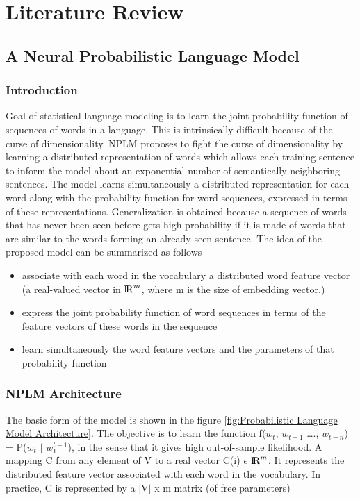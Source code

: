 \chapter{Literature Review}

\section{A Neural Probabilistic Language Model}
\subsection{Introduction}
Goal of statistical language modeling is to learn the joint probability function of sequences of words in a language. This is intrinsically difficult because of the curse of dimensionality. NPLM proposes to fight the curse of dimensionality by learning a distributed representation of words which allows each training sentence to inform the model about an exponential number of semantically neighboring sentences. The model learns simultaneously a distributed representation for each word along with the probability function for word sequences, expressed in terms of these representations. Generalization is obtained because a sequence of words that has never been seen before gets high probability if it is made of words that are similar to the words forming an already seen sentence. The idea of the proposed model can be summarized as follows

\begin{itemize}
    \item associate with each word in the vocabulary a distributed word feature vector (a real-valued vector in ${\rm I\!R}^m$, where m is the size of embedding vector.)
    \item express the joint probability function of word sequences in terms of the feature vectors of these words in the sequence 
    \item learn simultaneously the word feature vectors and the parameters of that probability function
\end{itemize}

\subsection{NPLM Architecture}
The basic form of the model is shown in the figure \ref{fig:Probabilistic Language Model Architecture}. The objective is to learn the function f($w_t$, $w_{t - 1}$ …., $w_{t - n}$) = P($w_t$ \(|\)  $w_1^{t - 1}$), in the sense that it gives high out-of-sample likelihood. A mapping C from any element of V to a real vector C(i) $\epsilon$ ${\rm I\!R}^m$. It represents the distributed feature vector associated with each word in the vocabulary. In practice, C is represented by a \(|\)V\(|\) x m matrix (of free parameters)

